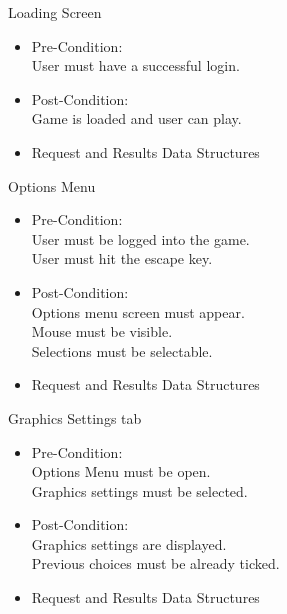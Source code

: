 \documentclass[letterpaper]{article}
\begin{document}
				\vspace{0.1in}Loading Screen
					\begin{itemize}
						\item Pre-Condition: \\
							User must have a successful login. \\
						\item Post-Condition: \\
						 	Game is loaded and user can play. \\
						\item Request and Results Data Structures \\
						
					\end{itemize}	
								
				\vspace{0.1in}Options Menu
					\begin{itemize}
						\item Pre-Condition: \\
							User must be logged into the game. \\
							User must hit the escape key. \\
						\item Post-Condition: \\
							Options menu screen must appear. \\
							Mouse must be visible. \\
							Selections must be selectable. \\
						\item Request and Results Data Structures \\
						
					\end{itemize}	
									
				\vspace{0.1in}Graphics Settings tab
					\begin{itemize}
						\item Pre-Condition: \\
							Options Menu must be open. \\
							Graphics settings must be selected. \\
						\item Post-Condition: \\
							Graphics settings are displayed. \\
							Previous choices must be already ticked. \\
						\item Request and Results Data Structures \\
						
					\end{itemize}
									
\end{document}
